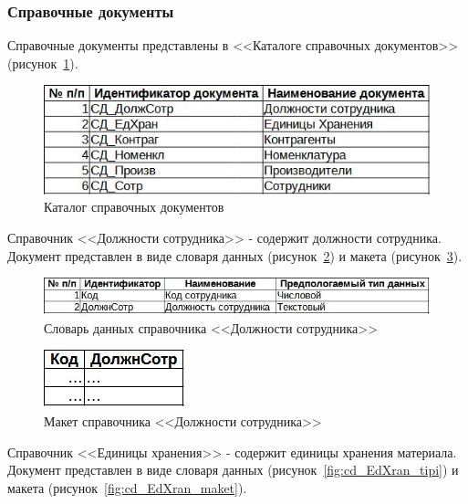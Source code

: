 \documentclass[12pt, a4paper, simple]{eskdtext}
\begin{document}
    \subsubsection{Справочные документы}

    Справочные документы представлены в <<Каталоге справочных документов>> (рисунок~\ref{fig:cd}).

    \begin{figure}[!h]
        \centering
        \includegraphics[]
            {_docs/СД.jpg}
        \caption{Каталог справочных документов}
        \label{fig:cd}
    \end{figure}

    Справочник <<Должности сотрудника>> - содержит должности сотрудника.
    Документ представлен в виде словаря данных (рисунок~\ref{fig:cd_DoljnCotr_tipi})
    и макета (рисунок~\ref{fig:cd_DoljnCotr_maket}).

    \begin{figure}[p!]
        \centering
        \includegraphics[]
            {_docs/СД_ДолжнСотр_типы.jpg}
        \caption{Словарь данных справочника <<Должности сотрудника>>}
        \label{fig:cd_DoljnCotr_tipi}
    \end{figure}

    \begin{figure}[p!]
        \centering
        \includegraphics[]
            {_docs/СД_ДолжнСотр_макет.jpg}
        \caption{Макет справочника <<Должности сотрудника>>}
        \label{fig:cd_DoljnCotr_maket}
    \end{figure}

    Справочник <<Единицы хранения>> - содержит единицы хранения материала.
    Документ представлен в виде словаря данных (рисунок~\ref{fig:cd_EdXran_tipi})
    и макета (рисунок~\ref{fig:cd_EdXran_maket}).
\end{document}
